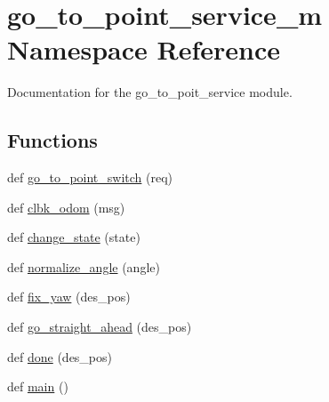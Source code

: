 \hypertarget{namespacego__to__point__service__m}{}\section{go\+\_\+to\+\_\+point\+\_\+service\+\_\+m Namespace Reference}
\label{namespacego__to__point__service__m}


Documentation for the go\+\_\+to\+\_\+poit\+\_\+service module.  


\subsection*{Functions}
\begin{DoxyCompactItemize}
\item 
def \hyperlink{namespacego__to__point__service__m_a5aa5049687ed47c4e5e85903267700ee}{go\+\_\+to\+\_\+point\+\_\+switch} (req)
\item 
def \hyperlink{namespacego__to__point__service__m_a379907ef466483603becace59e6f973b}{clbk\+\_\+odom} (msg)
\item 
def \hyperlink{namespacego__to__point__service__m_a40af22e9a0b3ac0544d0c08b246e6436}{change\+\_\+state} (state)
\item 
def \hyperlink{namespacego__to__point__service__m_a9016b8d25737fe805f75d9db52ff4680}{normalize\+\_\+angle} (angle)
\item 
def \hyperlink{namespacego__to__point__service__m_a45b937484f29d60d6578dd670f07f241}{fix\+\_\+yaw} (des\+\_\+pos)
\item 
def \hyperlink{namespacego__to__point__service__m_aa0efa6e8f30a39de9a6440888882daf1}{go\+\_\+straight\+\_\+ahead} (des\+\_\+pos)
\item 
def \hyperlink{namespacego__to__point__service__m_a22f1876bd87959557a463d43fa521ad3}{done} (des\+\_\+pos)
\item 
def \hyperlink{namespacego__to__point__service__m_a294bca40052b9b1c83ddf85a023b276e}{main} ()
\end{DoxyCompactItemize}

